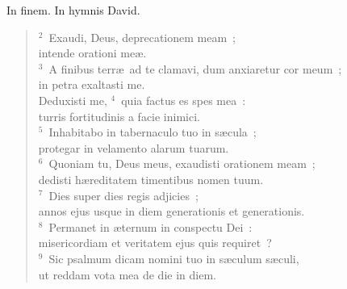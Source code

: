 \bchapter
\lettrine[lines=3,image=true,loversize=0.05,lraise=-0.03]{I}{}n finem. In hymnis David.
\begin{flushleft}\begin{verse}\vspace{6pt}${}^{2}$~Exaudi, Deus, deprecationem meam~;\\ intende orationi me\ae .\\
${}^{3}$~A finibus terr\ae\ ad te clamavi, dum anxiaretur cor meum~;\\ in petra exaltasti me.\\ Deduxisti me,
${}^{4}$~quia factus es spes mea~:\\ turris fortitudinis a facie inimici.\\
${}^{5}$~Inhabitabo in tabernaculo tuo in s\ae cula~;\\ protegar in velamento alarum tuarum.\\
${}^{6}$~Quoniam tu, Deus meus, exaudisti orationem meam~;\\ dedisti h\ae reditatem timentibus nomen tuum.\\
${}^{7}$~Dies super dies regis adjicies~;\\ annos ejus usque in diem generationis et generationis.\\
${}^{8}$~Permanet in \ae ternum in conspectu Dei~:\\ misericordiam et veritatem ejus quis requiret~?\\
${}^{9}$~Sic psalmum dicam nomini tuo in s\ae culum s\ae culi,\\ ut reddam vota mea de die in diem.\end{verse}\end{flushleft}




